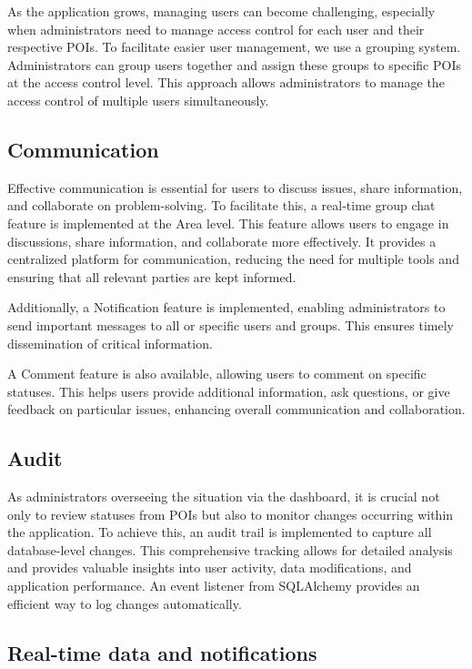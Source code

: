 As the application grows, managing users can become challenging, especially when administrators need to manage access control for each user and their respective POIs. To facilitate easier user management, we use a grouping system. Administrators can group users together and assign these groups to specific POIs at the access control level. This approach allows administrators to manage the access control of multiple users simultaneously.

\subsection{Communication}
\label{subsec:internship_experience:communication}

Effective communication is essential for users to discuss issues, share information, and collaborate on problem-solving. To facilitate this, a real-time group chat feature is implemented at the Area level. This feature allows users to engage in discussions, share information, and collaborate more effectively. It provides a centralized platform for communication, reducing the need for multiple tools and ensuring that all relevant parties are kept informed.

Additionally, a Notification feature is implemented, enabling administrators to send important messages to all or specific users and groups. This ensures timely dissemination of critical information.

A Comment feature is also available, allowing users to comment on specific statuses. This helps users provide additional information, ask questions, or give feedback on particular issues, enhancing overall communication and collaboration.

\subsection{Audit}
\label{subsec:internship_experience:audit}

As administrators overseeing the situation via the dashboard, it is crucial not only to review statuses from POIs but also to monitor changes occurring within the application. To achieve this, an audit trail is implemented to capture all database-level changes. This comprehensive tracking allows for detailed analysis and provides valuable insights into user activity, data modifications, and application performance. An event listener from SQLAlchemy provides an efficient way to log changes automatically.

\subsection{Real-time data and notifications}
\label{subsec:internship_experience:realtime_data_notifications}

